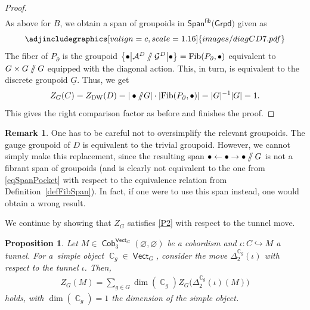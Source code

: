 \documentclass[pdftex]{sigma}
\DeclareMathOperator{\vect}{\mathsf{Vect}}
\DeclareMathOperator{\C}{\mathbb{C}}
\DeclareMathOperator{\Cob}{\mathsf{Cob}}
\newcommand{\sslash}{\mathbin{/\mkern-6mu/}}
\numberwithin{equation}{section}
\newtheorem{Proposition}[Proposition]{Proposition}
\theoremstyle{definition}
\newtheorem{Remark}[Remark]{Remark}
\begin{document}
\begin{proof}
\begin{align*}
 \end{align*}
 As above for $B$, we obtain a span of groupoids in $\mathsf{Span}^{\mathsf{fib}}(\mathsf{Grpd)}$ given as
 \[
 \centering
 \adjincludegraphics[valign=c, scale = 1.16]{images/diagCD7.pdf}
 \]
 The fiber of $P_{\partial}$ is the groupoid $\bigl\{\bullet \bigl| \mathcal{A}^{ D} \sslash \mathcal{G}^{ D} \bigr| \bullet\bigr\} = \mathrm{Fib}(P_{\partial}, \bullet)$ equivalent to $G \times G \sslash G$ equipped with the diagonal action. This, in turn, is equivalent to the discrete groupoid $\underline{G}$. Thus, we get
 \begin{align}\label{eqSpanPocket}
 Z_G(C) = Z_{\rm DW}(D) = |\bullet \sslash G| \cdot |\mathrm{Fib}(P_{\partial}, \bullet)| = |G|^{-1} |G| = 1.
 \end{align}
 This gives the right comparison factor as before and finishes the proof.
\end{proof}

\begin{Remark}One has to be careful not to oversimplify the relevant groupoids. The gauge groupoid of $D$ is equivalent to the trivial groupoid. However, we cannot simply make this replacement, since the resulting span $\bullet \leftarrow \bullet \rightarrow \bullet \sslash G$ is not a fibrant span of groupoids (and is clearly not equivalent to the one from \eqref{eqSpanPocket} with respect to the equivalence relation from Definition~\ref{defFibSpan}). In fact, if one were to use this span instead, one would obtain a wrong result.
\end{Remark}
We continue by showing that $Z_G$ satisfies \ref{P2} with respect to the tunnel move.

\begin{Proposition}\label{propDW2}
 Let $M \in \Cob_3^{\vect_G}(\varnothing, \varnothing)$ be a cobordism and $\iota\colon C \hookrightarrow M$ a tunnel. For a~simple object $\C_g \in \vect_G$, consider the move $\Delta_2^{\C_g}(\iota)$ with respect to the tunnel $\iota$. Then,
 \begin{align}
 \label{eqDWTun}
 Z_G(M) = \sum_{g \in G}\dim (\C_g)Z_G\bigl(\Delta_2^{\C_g}(\iota)(M)\bigr)
 \end{align}
 holds, with $\dim (\C_g) = 1$ the dimension of the simple object.
\end{Proposition}
\end{document}
